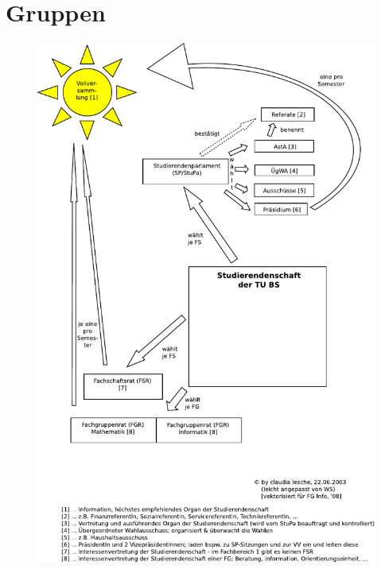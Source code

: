 \section{Gruppen}


\onecolumn
\begin{figure}[t]
  \includegraphics{bilder/gremienkunde.pdf}
\end{figure}
\twocolumn
